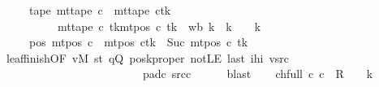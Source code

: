 \begin{isabellebody}
\ \ \ \ \ tape{}{\isacharcolon}{\kern0pt}\ {\isachardoublequoteopen}mt{\isacharunderscore}{\kern0pt}tape\ c{}\ {\isacharequal}{\kern0pt}\ {\isacharparenleft}{\kern0pt}mt{\isacharunderscore}{\kern0pt}tape\ c{}{\isacharparenright}{\kern0pt}{\isacharparenleft}{\kern0pt}tk\ {\isacharcolon}{\kern0pt}{\isacharequal}{\kern0pt}\isanewline
\ \ \ \ \ \ \ \ \ \ {\isacharparenleft}{\kern0pt}mt{\isacharunderscore}{\kern0pt}tape\ c{}\ tk{\isacharparenright}{\kern0pt}{\isacharparenleft}{\kern0pt}mt{\isacharunderscore}{\kern0pt}pos\ c{}\ tk\ {\isacharcolon}{\kern0pt}{\isacharequal}{\kern0pt}\ {\isacharquery}{\kern0pt}wb\ {\isacharparenleft}{\kern0pt}{\isacharquery}{\kern0pt}k\ {\isacharplus}{\kern0pt}\ {\isacharparenleft}{\kern0pt}{\isacharquery}{\kern0pt}k\ {\isacharminus}{\kern0pt}\ {}{\isacharparenright}{\kern0pt}\ {\isacharminus}{\kern0pt}\ {\isacharquery}{\kern0pt}k{\isacharparenright}{\kern0pt}{\isacharparenright}{\kern0pt}{\isacharparenright}{\kern0pt}{\isachardoublequoteclose}\isanewline
\ \ \ \ \ pos{}{\isacharcolon}{\kern0pt}\ {\isachardoublequoteopen}mt{\isacharunderscore}{\kern0pt}pos\ c{}\ {\isacharequal}{\kern0pt}\ {\isacharparenleft}{\kern0pt}mt{\isacharunderscore}{\kern0pt}pos\ c{}{\isacharparenright}{\kern0pt}{\isacharparenleft}{\kern0pt}tk\ {\isacharcolon}{\kern0pt}{\isacharequal}{\kern0pt}\ Suc\ {\isacharparenleft}{\kern0pt}mt{\isacharunderscore}{\kern0pt}pos\ c{}\ tk{\isacharparenright}{\kern0pt}{\isacharparenright}{\kern0pt}{\isachardoublequoteclose}\isanewline
\ \ \ \ \isamarkupfalse%
\ leaf{\isacharunderscore}{\kern0pt}finish{\isacharbrackleft}{\kern0pt}OF\ vM\ st{}\ qQ\ poskproper\ notLE{}\ last\ ihi\ vsrc{}\isanewline
\ \ \ \ \ \ \ \ \ \ \ \ \ \ \ \ \ \ \ \ \ \ \ \ \ pad{\isacharunderscore}{\kern0pt}c{}\ src{\isacharunderscore}{\kern0pt}c{}{\isacharbrackright}{\kern0pt}\isanewline
\ \ \ \ \isamarkupfalse%
\ blast\isanewline
\ \ \isamarkupfalse%
\ ch{\isacharunderscore}{\kern0pt}full{\isacharcolon}{\kern0pt}\ {\isachardoublequoteopen}{\isacharparenleft}{\kern0pt}c{\isacharprime}{\kern0pt}{\isacharcomma}{\kern0pt}\ c{}{\isacharparenright}{\kern0pt}\ {\isasymin}\ {\isacharquery}{\kern0pt}R\ {\isacharcircum}{\kern0pt}{\isacharcircum}{\kern0pt}\ {\isacharparenleft}{\kern0pt}{}\ {\isacharasterisk}{\kern0pt}\ {\isacharquery}{\kern0pt}k{\isacharparenright}{\kern0pt}{\isachardoublequoteclose}\isanewline

\end{isabellebody}
